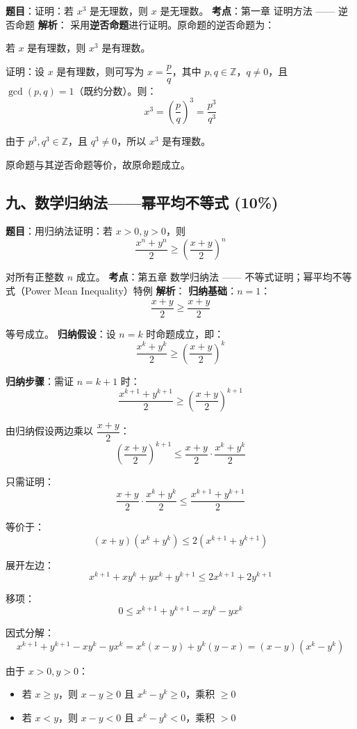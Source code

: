 \documentclass[10pt,a4paper,openany]{ctexbook}
\theoremstyle{definition}
\theoremstyle{remark}
\renewenvironment{quote}
  {\list{}{\leftmargin=1em\rightmargin=0pt\topsep=0.5pt\partopsep=0pt}\item[]}
  {\endlist}
\begin{document}
\textbf{题目}：证明：若 $x^3$ 是无理数，则 $x$ 是无理数。
\textbf{考点}：第一章 证明方法 —— 逆否命题
\textbf{解析}：
采用\textbf{逆否命题}进行证明。原命题的逆否命题为：
\begin{quote}
若 $x$ 是有理数，则 $x^3$ 是有理数。

证明：设 $x$ 是有理数，则可写为 $x = \dfrac{p}{q}$，其中 $p, q \in \mathbb{Z}$，$q \neq 0$，且 $\gcd(p, q) = 1$（既约分数）。则：
\[
x^3 = \left(\frac{p}{q}\right)^3 = \frac{p^3}{q^3}
\]

由于 $p^3, q^3 \in \mathbb{Z}$，且 $q^3 \neq 0$，所以 $x^3$ 是有理数。

原命题与其逆否命题等价，故原命题成立。

\end{quote}
\vspace{-2pt}

\subsection{九、数学归纳法——幂平均不等式 (10\%)}

\textbf{题目}：用归纳法证明：若 $x > 0, y > 0$，则
\[
\frac{x^n + y^n}{2} \ge \left(\frac{x + y}{2}\right)^n
\]

对所有正整数 $n$ 成立。
\textbf{考点}：第五章 数学归纳法 —— 不等式证明；幂平均不等式（Power Mean Inequality）特例
\textbf{解析}：
\textbf{归纳基础}：$n = 1$：
\[
\frac{x + y}{2} \ge \frac{x + y}{2}
\]

等号成立。
\textbf{归纳假设}：设 $n = k$ 时命题成立，即：
\[
\frac{x^k + y^k}{2} \ge \left(\frac{x + y}{2}\right)^k
\]

\textbf{归纳步骤}：需证 $n = k + 1$ 时：
\[
\frac{x^{k+1} + y^{k+1}}{2} \ge \left(\frac{x + y}{2}\right)^{k+1}
\]

由归纳假设两边乘以 $\dfrac{x+y}{2}$：
\[
\left(\frac{x + y}{2}\right)^{k+1} \le \frac{x + y}{2} \cdot \frac{x^k + y^k}{2}
\]

只需证明：
\[
\frac{x + y}{2} \cdot \frac{x^k + y^k}{2} \le \frac{x^{k+1} + y^{k+1}}{2}
\]

等价于：
\[
(x + y)(x^k + y^k) \le 2(x^{k+1} + y^{k+1})
\]

展开左边：
\[
x^{k+1} + xy^k + yx^k + y^{k+1} \le 2x^{k+1} + 2y^{k+1}
\]

移项：
\[
0 \le x^{k+1} + y^{k+1} - xy^k - yx^k
\]

因式分解：
\[
x^{k+1} + y^{k+1} - xy^k - yx^k = x^k(x - y) + y^k(y - x) = (x - y)(x^k - y^k)
\]

由于 $x > 0, y > 0$：
\begin{itemize}
\item 若 $x \ge y$，则 $x - y \ge 0$ 且 $x^k - y^k \ge 0$，乘积 $\ge 0$
\item 若 $x < y$，则 $x - y < 0$ 且 $x^k - y^k < 0$，乘积 $> 0$

\end{itemize}
\end{document}
